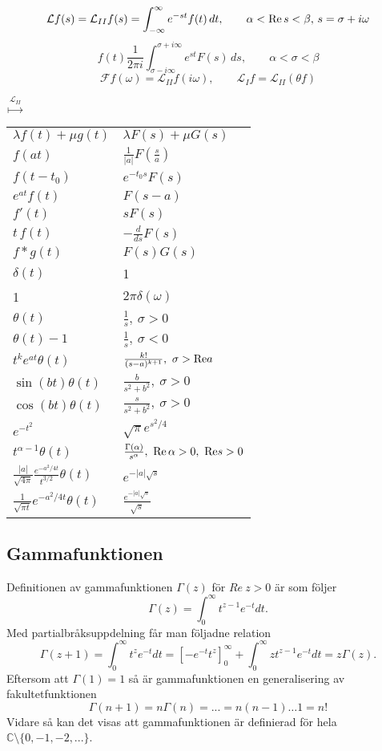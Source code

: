 \documentclass{article}
\begin{document}
\[
 \mathcal L f(s) = \mathcal L_{II} f(s) = \int_{-\infty}^\infty e^{-st} f(t)\, dt, \qquad \alpha < {\rm Re}\, s < \beta,\, s = \sigma + i\omega
\]
\[
 f(t) \frac{1}{2\pi i} \int_{\sigma- i\infty}^{\sigma + i\infty} e^{st} F(s)\, ds, \qquad \alpha < \sigma < \beta
\]
\[
 \mathcal F f(\omega) = \mathcal L_{II} f(i\omega), \qquad \mathcal L_I f = \mathcal L_{II}(\theta f)
\]
\newpage
\begin{center}
{\Large $\stackrel{\mathcal L_{II}}{\longmapsto}$}\\
\begin{tabular}{l|l}
\hline
$\lambda f(t) + \mu g(t)$ & $\lambda F(s) + \mu G(s)$ \\
$f(at)$ & $\frac 1{|a|} F \left(\frac s a\right)$ \\
$f(t-t_0)$ & $e^{-t_0 s} F(s)$ \\
$e^{a t} f(t)$ & $F (s - a)$ \\
$f'(t)$ & $s F(s)$ \\
$t\, f(t)$ & $- \frac{d}{ds} F(s)$ \\
$f*g(t)$ & $F(s) G(s) $ \\
\hline
$\delta(t)$ & 1 \\
1 & $2\pi \delta(\omega)$ \\
$\theta(t)$ & $\frac 1s,\ \sigma > 0$ \\
$\theta(t) - 1$ & $\frac 1s,\ \sigma < 0$ \\
$t^k e^{at} \theta(t)$ & $\frac{k!}{(s-a)^{k+1}},\ \sigma > {\rm Re} a$ \\
$\sin(bt)\theta(t)$ & $\frac{b}{s^2 + b^2},\ \sigma > 0$ \\
$\cos(bt)\theta(t)$ & $\frac{s}{s^2+b^2},\ \sigma > 0$ \\
$e^{-t^2}$ & $\sqrt\pi e^{s^2/4}$ \\
$t^{\alpha-1} \theta(t)$ & $\frac{\Gamma(\alpha)}{s^\alpha},\ {\rm Re}\, \alpha >0,\ {\rm Re} s > 0$ \\
$\frac{|a|}{\sqrt{4\pi}} \frac{e^{-a^2/4t}}{t^{3/2}} \theta(t)$ & $e^{-|a|\sqrt s}$ \\
$\frac{1}{\sqrt{\pi t}} e^{-a^2/4t} \theta(t)$ & $\frac{e^{-|a|\sqrt s}}{\sqrt s}$ \\
\hline
\end{tabular}
\end{center}
\subsection{Gammafunktionen}
Definitionen av gammafunktionen $\Gamma(z)$ för $Re \ z>0$ är som följer
$$
\Gamma(z)=\int_0^{\infty}t^{z-1}e^{-t}dt.
$$
Med partialbråksuppdelning får man följadne relation
$$
\Gamma(z+1)=\int_0^{\infty}t^{z}e^{-t}dt=[-e^{-t}t^z]_0^{\infty}+\int_0^{\infty}zt^{z-1}e^{-t}dt=z\Gamma(z).
$$
Eftersom att $\Gamma(1)=1$ så är gammafunktionen en generalisering av fakultetfunktionen
$$
\Gamma(n+1)=n\Gamma(n)=...=n(n-1)\hdots 1=n!
$$
Vidare så kan det visas att gammafunktionen är definierad för hela $\mathbb{C}\setminus\{0,-1,-2,...\}$.
\end{document}
